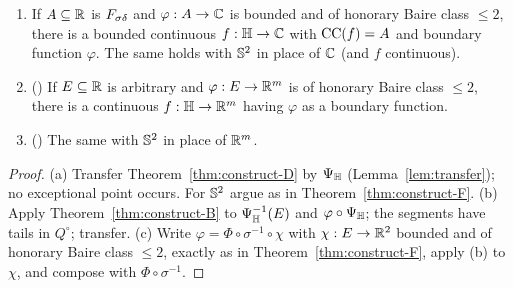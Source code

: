 \begin{theorem}\label{thm:construct-H}
\begin{enumerate}[label=(\alph*)]
\item If $A\subseteq\mathbb{R}$ is $F_{\sigma\delta}$ and $\varphi:A\to\mathbb{C}$ is bounded and of honorary Baire class $\le2$, there is a bounded continuous
  $f:\mathbb{H}\to\mathbb{C}$ with $\operatorname{CC}(f)=A$ and boundary function $\varphi$. The same holds with $\mathbb{S}^2$ in place of $\mathbb{C}$ (and $f$
  continuous).
\item (\cite[Theorem 6]{Diss}) If $E\subseteq\mathbb{R}$ is arbitrary and $\varphi:E\to\mathbb{R}^m$ is of honorary Baire class $\le2$, there is a
  continuous $f:\mathbb{H}\to\mathbb{R}^m$ having $\varphi$ as a boundary function.
\item (\cite[Theorem 7]{Diss}) The same with $\mathbb{S}^2$ in place of $\mathbb{R}^m$.
\end{enumerate}
\end{theorem}
\begin{proof}
(a) Transfer Theorem~\ref{thm:construct-D} by $\Psi_{\mathbb{H}}$ (Lemma~\ref{lem:transfer}); no exceptional point occurs. For $\mathbb{S}^2$
argue as in Theorem~\ref{thm:construct-F}. (b) Apply Theorem~\ref{thm:construct-B} to $\Psi_{\mathbb{H}}^{-1}(E)$ and
$\varphi\circ\Psi_{\mathbb{H}}$; the segments have tails in $Q^\circ$; transfer. (c) Write $\varphi=\Phi\circ\sigma^{-1}\circ\chi$ with
$\chi:E\to\mathbb{R}^2$ bounded and of honorary Baire class $\le2$, exactly as in Theorem~\ref{thm:construct-F}, apply (b) to $\chi$,
and compose with $\Phi\circ\sigma^{-1}$.
\end{proof}
